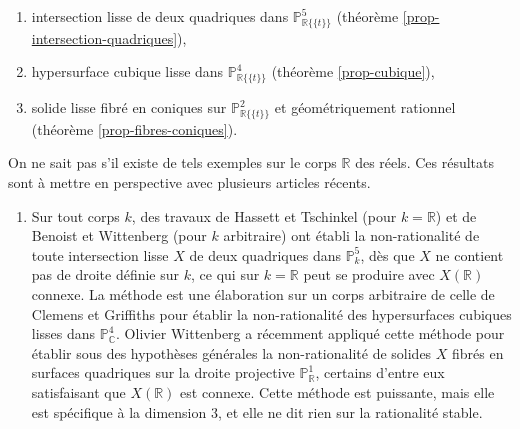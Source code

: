 \documentclass[JEP,XML,SOM,Unicode,francais,published]{cedram}
\newenvironment{enumeratei}
{\bgroup\def\theenumi{\roman{enumi}}\def\theenumii{\arabic{enumii}}\begin{enumerate}}
{\end{enumerate}\egroup}
\theoremstyle{definition}
\newcommand{\C}{\mathbb C}
\newcommand{\R}{\mathbb R}
\renewcommand{\P}{\mathbb P}
\newcommand{\puiseux}{\mathbb{R}\{\!\{t\}\!\}}
\begin{document}
\begin{enumeratei}
\item\label{enum:i}
intersection lisse de deux quadriques dans $\P^5_{\puiseux}$ (théorème \ref{prop-intersection-quadriques}),
\item\label{enum:ii}
hypersurface cubique lisse dans $\P^4_{\puiseux}$ (théorème \ref{prop-cubique}),
\item\label{enum:iii}
solide lisse fibré en coniques sur $ \P^2_{\puiseux}$ et géométriquement rationnel (théorème \ref{prop-fibres-coniques}).
\end{enumeratei}
On ne sait pas s'il existe de tels exemples sur le corps $\R$ des réels.
Ces résultats sont à mettre en perspective avec plusieurs articles récents.

\begin{enumerate}
\item Sur tout corps $k$, des travaux de Hassett et Tschinkel \cite{hassett2021rationality} (pour $k=\R$) et de Benoist et Wittenberg \cite{benoist2019intermediate} (pour $k$ arbitraire) ont établi
la non-rationalité de toute intersection lisse $X$ de deux quadriques
dans $\P^5_{k}$, dès que $X$ ne contient
pas de droite définie sur $k$, ce qui sur $k=\R$ peut se produire avec $X(\R)$ connexe.
La méthode est une élaboration sur un corps arbitraire de celle de Clemens et
Griffiths pour établir la non-rationalité des hypersurfaces cubiques lisses dans $\P^4_{\C}$.
Olivier Wittenberg a récemment appliqué cette méthode pour établir sous des hypothèses générales la non-rationalité
de solides $X$ fibrés en surfaces quadriques sur la droite projective $\P^1_{\R}$, certains d'entre eux satisfaisant que $X(\R)$ est connexe. Cette méthode est puissante, mais elle est spécifique à la dimension $3$, et elle ne dit rien sur la rationalité stable.


\end{enumerate}
\end{document}

